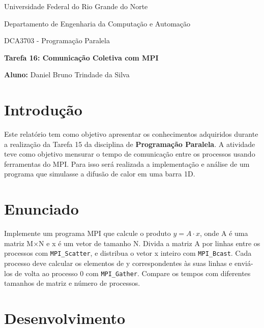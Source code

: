 \documentclass[a4paper, 12pt]{article}
\begin{document}
	
	\begin{center}
		Universidade Federal do Rio Grande do Norte
		
		Departamento de Engenharia da Computação e Automação  
		
		DCA3703 - Programação Paralela  
		
		\textbf{Tarefa 16: Comunicação Coletiva com MPI}  
		
		\textbf{Aluno:} Daniel Bruno Trindade da Silva  
	\end{center}  
	
	\section{Introdução}
	
	\hspace{0.62cm}Este relatório tem como objetivo apresentar os conhecimentos adquiridos durante a realização da Tarefa 15 da disciplina de \textbf{Programação Paralela}. A atividade teve como objetivo mensurar o tempo de comunicação entre os processos usando ferramentas do MPI. Para isso será realizada a implementação e análise de um programa que simulasse a difusão de calor em uma barra 1D. 
	
	\section{Enunciado}
	
	\hspace{0.62cm}Implemente um programa MPI que calcule o produto $y = A \cdot x$, onde A é uma matriz M×N e x é um vetor de tamanho N. Divida a matriz A por linhas entre os processos com \texttt{MPI\_Scatter}, e distribua o vetor x inteiro com \texttt{MPI\_Bcast}. Cada processo deve calcular os elementos de y correspondentes às suas linhas e enviá-los de volta ao processo 0 com \texttt{MPI\_Gather}. Compare os tempos com diferentes tamanhos de matriz e número de processos.
	
	\section{Desenvolvimento}
	
\end{document}
